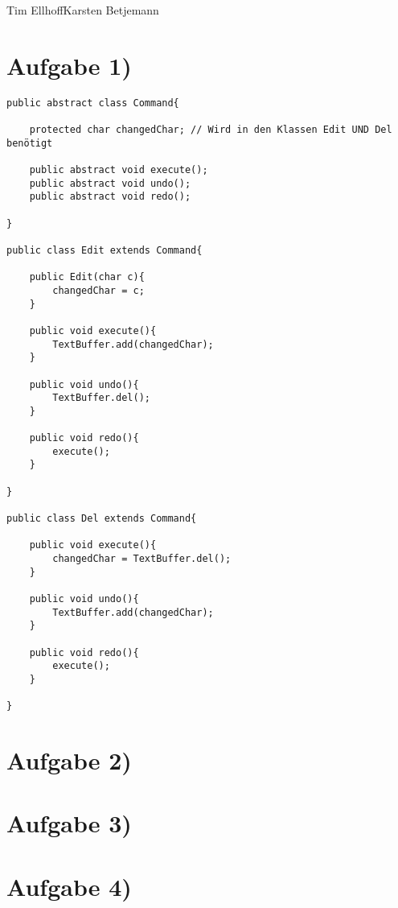 \documentclass{swp1}
\begin{document}
          {Tim Ellhoff}{Karsten Betjemann}{}
          
\section*{Aufgabe 1)}

\begin{lstlisting}
public abstract class Command{
	
	protected char changedChar; // Wird in den Klassen Edit UND Del benötigt
	
	public abstract void execute();
	public abstract void undo();
	public abstract void redo();

}

public class Edit extends Command{
	
	public Edit(char c){
		changedChar = c;
	}
	
	public void execute(){
		TextBuffer.add(changedChar);
	}
	
	public void undo(){
		TextBuffer.del();
	}
	
	public void redo(){
		execute();
	}

}

public class Del extends Command{
	
	public void execute(){
		changedChar = TextBuffer.del();
	}
	
	public void undo(){
		TextBuffer.add(changedChar);
	}
	
	public void redo(){
		execute();
	}

}
\end{lstlisting}


\section*{Aufgabe 2)}

\section*{Aufgabe 3)}

\section*{Aufgabe 4)}
\end{document}
